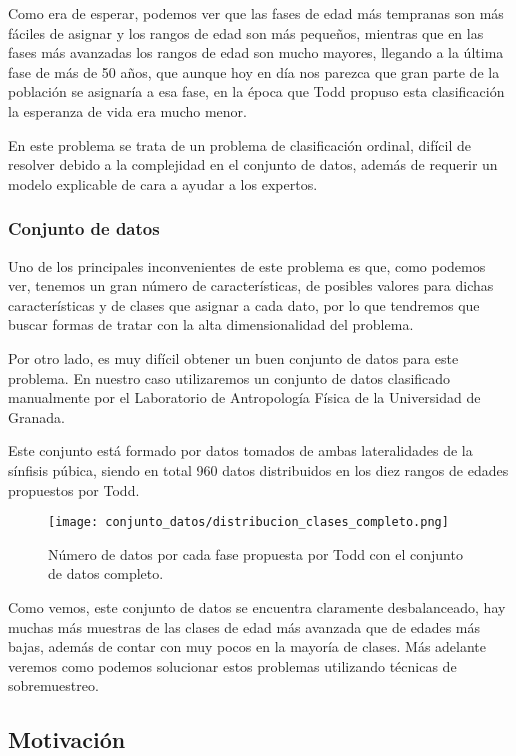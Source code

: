 Como era de esperar, podemos ver que las fases de edad más tempranas son más fáciles de asignar y los rangos de edad son más pequeños, mientras que en las fases más avanzadas los rangos de edad son mucho mayores, llegando a la última fase de más de 50 años, que aunque hoy en día nos parezca que gran parte de la población se asignaría a esa fase, en la época que Todd propuso esta clasificación la esperanza de vida era mucho menor.

En este problema se trata de un problema de clasificación ordinal, difícil de resolver debido a la complejidad en el conjunto de datos, además de requerir un modelo explicable de cara a ayudar a los expertos.

\subsubsection{Conjunto de datos}

Uno de los principales inconvenientes de este problema es que, como podemos ver, tenemos un gran número de características, de posibles valores para dichas características y de clases que asignar a cada dato, por lo que tendremos que buscar formas de tratar con la alta dimensionalidad del problema.

Por otro lado, es muy difícil obtener un buen conjunto de datos para este problema. En nuestro caso utilizaremos un conjunto de datos clasificado manualmente por el Laboratorio de Antropología Física de la Universidad de Granada\cite{laboratorioForenseUGR}.

Este conjunto está formado por datos tomados de ambas lateralidades de la sínfisis púbica, siendo en total 960 datos distribuidos en los diez rangos de edades propuestos por Todd.


\begin{figure}[H]
	\centering
	\texttt{[image: conjunto\_datos/distribucion\_clases\_completo.png]}
	\caption{Número de datos por cada fase propuesta por Todd con el conjunto de datos completo.}
	\label{fig:conteo_original}
\end{figure}


Como vemos, este conjunto de datos se encuentra claramente desbalanceado, hay muchas más muestras de las clases de edad más avanzada que de edades más bajas, además de contar con muy pocos en la mayoría de clases. Más adelante veremos como podemos solucionar estos problemas utilizando técnicas de sobremuestreo.

\subsection{Motivación}

